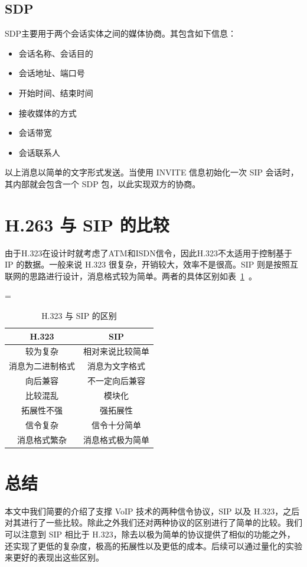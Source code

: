 \documentclass[lang=cn]{elegantpaper}
\begin{document}
\subsection{SDP}
SDP\cite{rfc2327}主要用于两个会话实体之间的媒体协商。其包含如下信息：
\begin{itemize}
    \item 会话名称、会话目的
    \item 会话地址、端口号
    \item 开始时间、结束时间
    \item 接收媒体的方式
    \item 会话带宽
    \item 会话联系人
\end{itemize}

以上消息以简单的文字形式发送。当使用 INVITE 信息初始化一次 SIP 会话时，其内部就会包含一个 SDP 包，以此实现双方的协商。

\section{H.263 与 SIP 的比较}
由于H.323在设计时就考虑了ATM和ISDN信令，因此H.323不太适用于控制基于 IP 的数据。一般来说 H.323 很复杂，开销较大，效率不是很高。SIP 则是按照互联网的思路进行设计，消息格式较为简单。两者的具体区别如表~\ref{tab:cmp}~。

=
\begin{table}
    \begin{center}
        \begin{tabular}{cc}
            \hline
            \multicolumn{1}{|c|}{\textbf{H.323}}   & \multicolumn{1}{c|}{\textbf{SIP}}     \\ \hline
            \multicolumn{1}{|c|}{较为复杂}         & \multicolumn{1}{c|}{相对来说比较简单} \\ \hline
            \multicolumn{1}{|c|}{消息为二进制格式} & \multicolumn{1}{c|}{消息为文字格式}   \\ \hline
            \multicolumn{1}{|c|}{向后兼容}         & \multicolumn{1}{c|}{不一定向后兼容}   \\ \hline
            \multicolumn{1}{|c|}{比较混乱}         & \multicolumn{1}{c|}{模块化}           \\ \hline
            \multicolumn{1}{|c|}{拓展性不强}       & \multicolumn{1}{c|}{强拓展性}         \\ \hline
            \multicolumn{1}{|c|}{信令复杂}         & \multicolumn{1}{c|}{信令十分简单}     \\ \hline
            \multicolumn{1}{|c|}{消息格式繁杂}     & \multicolumn{1}{c|}{消息格式极为简单} \\ \hline
        \end{tabular}
    \end{center}
    \caption{H.323 与 SIP 的区别}
    \label{tab:cmp}
\end{table}

\section{总结}
本文中我们简要的介绍了支撑 VoIP 技术的两种信令协议，SIP 以及 H.323，之后对其进行了一些比较。除此之外我们还对两种协议的区别进行了简单的比较。我们可以注意到 SIP 相比于 H.323，除去以极为简单的协议提供了相似的功能之外，还实现了更低的复杂度，极高的拓展性以及更低的成本。后续可以通过量化的实验来更好的表现出这些区别。



\end{document}
